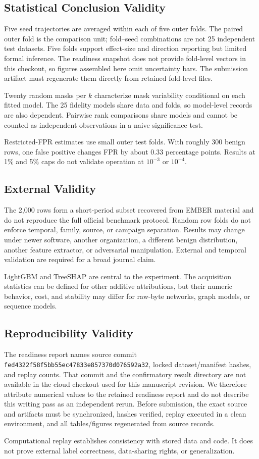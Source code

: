 \subsection{Statistical Conclusion Validity}

Five seed trajectories are averaged within each of five outer folds. The paired
outer fold is the comparison unit; fold--seed combinations are not 25 independent
test datasets. Five folds support effect-size and direction reporting but limited
formal inference. The readiness snapshot does not provide fold-level vectors in
this checkout, so figures assembled here omit uncertainty bars. The submission
artifact must regenerate them directly from retained fold-level files.

Twenty random masks per $k$ characterize mask variability conditional on each
fitted model. The 25 fidelity models share data and folds, so model-level records
are also dependent. Pairwise rank comparisons share models and cannot be counted
as independent observations in a naive significance test.

Restricted-FPR estimates use small outer test folds. With roughly 300 benign
rows, one false positive changes FPR by about 0.33 percentage points. Results at
1\% and 5\% caps do not validate operation at $10^{-3}$ or $10^{-4}$.

\subsection{External Validity}

The 2,000 rows form a short-period subset recovered from EMBER material and do
not reproduce the full official benchmark protocol. Random row folds do not
enforce temporal, family, source, or campaign separation. Results may change
under newer software, another organization, a different benign distribution,
another feature extractor, or adversarial manipulation. External and temporal
validation are required for a broad journal claim.

LightGBM and TreeSHAP are central to the experiment. The acquisition statistics
can be defined for other additive attributions, but their numeric behavior,
cost, and stability may differ for raw-byte networks, graph models, or sequence
models.

\subsection{Reproducibility Validity}

The readiness report names source commit
\texttt{fed4322f58f5bb55ec47833e857370d076592a32}, locked dataset/manifest hashes,
and replay counts. That commit and the confirmatory result directory are not
available in the cloud checkout used for this manuscript revision. We therefore
attribute numerical values to the retained readiness report and do not describe
this writing pass as an independent rerun. Before submission, the exact source
and artifacts must be synchronized, hashes verified, replay executed in a clean
environment, and all tables/figures regenerated from source records.

Computational replay establishes consistency with stored data and code. It does
not prove external label correctness, data-sharing rights, or generalization.
